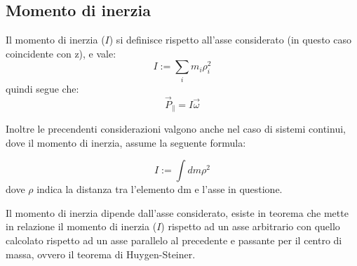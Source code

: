 \documentclass[11pt, a4paper, openright]{book}
\theoremstyle{plain}
\theoremstyle{definition}
\begin{document}
\newpage
\subsection{Momento di inerzia}
Il momento di inerzia ($I$) si definisce rispetto all'asse considerato (in questo caso coincidente con z), e vale:
\begin{equation}
    I := \sum_i m_i \rho_i^2
\end{equation} 
quindi segue che:
\begin{equation}
    \vec{P}_\parallel = I\vec{\omega}
\end{equation}

Inoltre le precendenti considerazioni valgono anche nel caso di sistemi continui, dove il momento di inerzia, assume la seguente formula:

\begin{equation}
    I := \int dm\rho^2
\end{equation}
dove $\rho$ indica la distanza tra l'elemento dm e l'asse in questione.

Il momento di inerzia dipende dall'asse considerato, esiste in teorema che mette in relazione il momento di inerzia ($I$) rispetto ad un asse arbitrario con quello calcolato rispetto ad un asse parallelo al precedente e passante per il centro di massa, ovvero il teorema di Huygen-Steiner.
\end{document}

